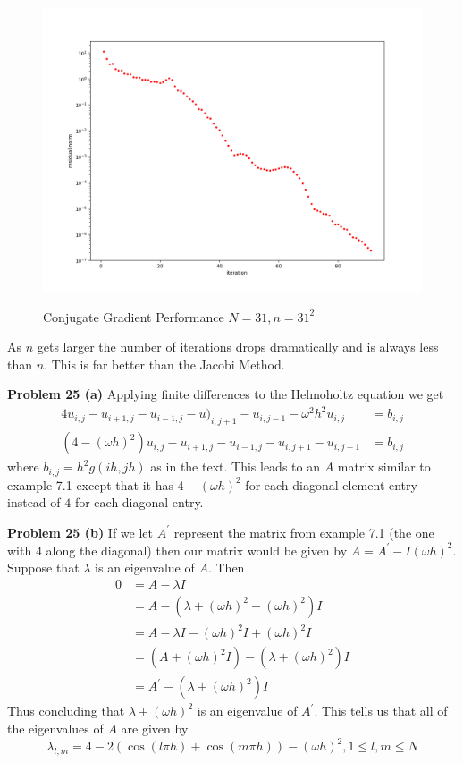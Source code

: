 \documentclass[12pt]{article}
\newcommand{\problem}[1]{\hspace{-4 ex} \large \textbf{Problem #1} }
\begin{document}
\begin{figure}[H]
	\caption{Conjugate Gradient Performance $N=31, n=31^2$}
	\includegraphics[width=1\textwidth]{hwch7_figure_3_cg_N31_2}
	\label{13c}
	\centering
\end{figure}

As $n$ gets larger the number of iterations drops dramatically and is always less than $n$. This is far better than the Jacobi Method. 

\bigbreak

\problem{25 (a)} Applying finite differences to the Helmoholtz equation we get
\begin{align*}
	4u_{i,j} - u_{i+1,j} - u_{i-1,j} - u)_{i,j+1} - u_{i,j-1} - \omega^2 h^2 u_{i,j} & = b_{i,j} \\
	(4- (\omega h)^2)u_{i,j} - u_{i+1,j} - u_{i-1,j} - u_{i,j+1} - u_{i,j-1} & = b_{i,j}
\end{align*}
where $b_{i,j} = h^2g(ih,jh)$ as in the text. This leads to an $A$ matrix similar to example 7.1 except that it has $4-(\omega h)^2$ for each diagonal element entry instead of $4$ for each diagonal entry. \bigbreak

\bigbreak

\problem{25 (b)} If we let $A^\prime$ represent the matrix from example 7.1 (the one with $4$ along the diagonal) then our matrix would be given by $A = A^\prime- I(\omega h)^2$. Suppose that $\lambda$ is an eigenvalue of $A$. Then
\begin{align*}
	0 & = A - \lambda I \\
	& = A - (\lambda + (\omega h)^2 - (\omega h)^2)I \\
	& = A - \lambda I - (\omega h)^2I + (\omega h)^2I \\
	& = (A + (\omega h)^2I) - (\lambda + (\omega h)^2)I \\
	& = A^\prime - (\lambda + (\omega h)^2)I
\end{align*}
Thus concluding that $\lambda + (\omega h)^2$ is an eigenvalue of $A^\prime$. This tells us that all of the eigenvalues of $A$ are given by
$$
\lambda_{l,m} = 4 - 2(\cos(l \pi h) + \cos(m \pi h)) - (\omega h)^2, 1\leq l,m \leq N
$$
\end{document}
